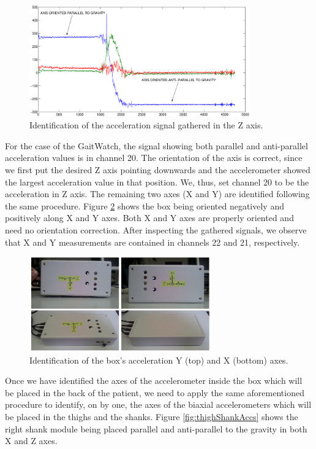 \begin{figure}[H]
\centering
\includegraphics[width=0.85\textwidth]{figures/ZaxisAccTrunkID}
\caption{Identification of the acceleration signal gathered in the Z axis.}
\label{fig:ZaxisAccSignals}
\end{figure}

For the case of the GaitWatch, the signal showing both parallel and anti-parallel acceleration values is in channel 20. The orientation of the axis is correct, since we first put the desired Z axis pointing downwards and the accelerometer showed the largest acceleration value in that position. We, thus, set channel 20 to be the acceleration in Z axis. The remaining two axes (X and Y) are identified following the same procedure. Figure \ref{fig:XandYAccPositions} shows the box being oriented negatively and positively along X and Y axes. Both X and Y axes are properly oriented and need no orientation correction. After inspecting the gathered signals, we observe that X and Y measurements are contained in channels 22 and 21, respectively. 

\begin{figure}[H]
\centering
\includegraphics[width=0.7\textwidth]{figures/XandYAccPositions.jpg}
\caption{Identification of the box's acceleration Y (top) and X (bottom) axes.}
\label{fig:XandYAccPositions}
\end{figure}

Once we have identified the axes of the accelerometer inside the box which will be placed in the back of the patient, we need to apply the same aforementioned procedure to identify, on by one, the axes of the biaxial accelerometers which will be placed in the thighs and the shanks. Figure \ref{fig:thighShankAccs} shows the right shank module being placed parallel and anti-parallel to the gravity in both X and Z axes.

